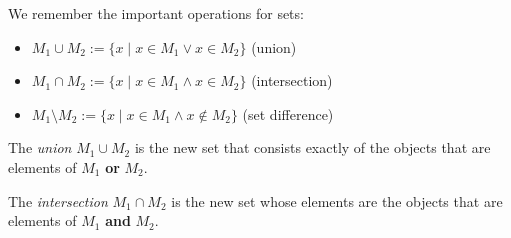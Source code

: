 

We remember the important operations for sets:

\begin{itemize}
 \item $M_1 \cup M_2 := \{ x \mid x\in M_1 \vee x \in M_2 \}$ (union)
 \item $M_1 \cap M_2 := \{ x \mid x \in M_1 \wedge x \in M_2\}$ (intersection)
 \item $M_1 \setminus M_2 := \{ x \mid x \in M_1 \wedge x \not\in M_2 \}$ (set difference)
\end{itemize}

\begin{Definition}
   The \emph{union} $M_1\cup M_2$ 
   is the new set that consists exactly
   of the objects that are elements of $M_1$ \textbf{or} $M_2$.
  
  The \emph{intersection} $M_1\cap M_2$ 
  is the new set
  whose elements 
  are the objects that are elements of $M_1$ \textbf{and} $M_2$.


\end{Definition}
